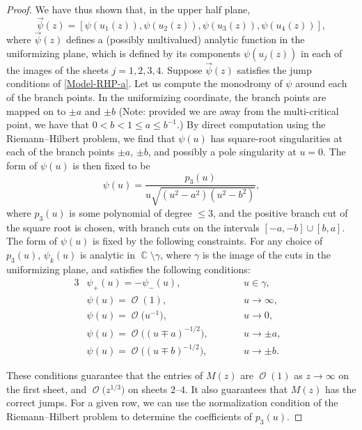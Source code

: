 \documentclass[10pt,a4paper]{amsart}
\DeclareMathOperator{\CC}{\mathbb{C}}
\DeclareMathOperator{\OO}{\mathcal{O}}
\numberwithin{equation}{section}
\begin{document}
\begin{proof}
We have thus shown that, in the upper half plane,
 \begin{equation*}
 \vec{\psi}(z) = [\psi(u_1(z)), \psi(u_2(z)), \psi(u_3(z)), \psi(u_4(z)) ],
 \end{equation*}
where $\vec{\psi}(z)$ defines a (possibly multivalued) analytic function in the uniformizing plane, which is defined by its components $\psi(u_j(z))$ in each of the images of the sheets $j = 1,2,3,4$. Suppose $\vec{\psi}(z)$ satisfies the jump conditions of \eqref{Model-RHP-a}.
Let us compute the monodromy of $\psi$ around each of the branch points. In the uniformizing coordinate, the branch points are mapped on
to $\pm a$ and $\pm b$ \big(Note: provided we are away from the multi-critical point, we have that $0 < b < 1 \leq a \leq b^{-1}$.\big) By direct computation using the Riemann--Hilbert problem, we find that $\psi(u)$ has square-root singularities at each of the branch points $\pm a$, $\pm b$,
and possibly a pole singularity at $u=0$. The form of $\psi(u)$ is then fixed to be
 \begin{equation*}
 \psi(u) = \frac{p_3(u)}{u\sqrt{(u^2-a^2)(u^2-b^2)}},
 \end{equation*}
where $p_3(u)$ is some polynomial of degree $\leq 3$, and the positive branch cut of the square root is chosen, with branch cuts on the intervals $[-a,-b]\cup [b,a]$.
The form of $\psi(u)$ is fixed by the following constraints. For any choice of $p_3(u)$, $\psi_k(u)$ is analytic in $\CC \setminus \gamma$, where $\gamma$ is the image of the cuts in the uniformizing plane, and satisfies the following conditions:
\begin{alignat*}{3}
 &\psi_+(u) = -\psi_-(u),\qquad&& u \in \gamma,&\\
 &\psi(u) = \OO(1),\qquad&& u \to \infty,&\\
 &\psi(u) = \OO\bigl(u^{-1}\bigr),\qquad&& u \to 0,&\\
 &\psi(u) = \OO\bigl( (u\mp a)^{-1/2}\bigr),\qquad&& u \to \pm a,&\\
 &\psi(u) = \OO\bigl( (u\mp b)^{-1/2}\bigr),\qquad&& u \to \pm b.&
\end{alignat*}

These conditions guarantee that the entries of $M(z)$ are $\OO(1)$ as $z\to \infty$ on the first sheet, and $\OO\bigl(z^{1/3}\bigr)$ on sheets $2$--$4$. It also guarantees that $M(z)$ has the correct jumps.
For a given row, we can use the normalization condition of the Riemann--Hilbert problem to determine the coefficients of $p_3(u)$.


\end{proof}
\end{document}

